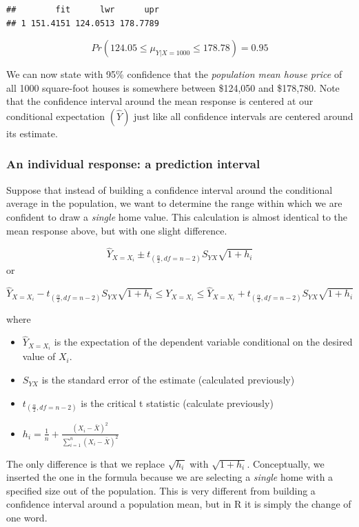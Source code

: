 \documentclass[
]{book}
\begin{document}
\begin{verbatim}
##        fit      lwr      upr
## 1 151.4151 124.0513 178.7789
\end{verbatim}

\[Pr(124.05\leq\mu_{Y|X=1000}\leq178.78)=0.95\]

We can now state with 95\% confidence that the \emph{population mean house price} of all 1000 square-foot houses is somewhere between \$124,050 and \$178,780. Note that the confidence interval around the mean response is centered at our conditional expectation \((\hat{Y})\) just like all confidence intervals are centered around its estimate.

\subsubsection*{An individual response: a prediction interval}\label{an-individual-response-a-prediction-interval}

Suppose that instead of building a confidence interval around the conditional average in the population, we want to determine the range within which we are confident to draw a \emph{single} home value. This calculation is almost identical to the mean response above, but with one slight difference.

\[ \hat{Y}_{X=X_i} \pm t_{(\frac{\alpha}{2},df=n-2)}S_{YX} \sqrt{1+h_i}\]
or

\[ \hat{Y}_{X=X_i} - t_{(\frac{\alpha}{2},df=n-2)}S_{YX} \sqrt{1+h_i} \leq Y_{X=X_i} \leq \hat{Y}_{X=X_i} + t_{(\frac{\alpha}{2},df=n-2)}S_{YX} \sqrt{1+h_i}\]

where

\begin{itemize}
\item
  \(\hat{Y}_{X=X_i}\) is the expectation of the dependent variable conditional on the desired value of \(X_i\).
\item
  \(S_{YX}\) is the standard error of the estimate (calculated previously)
\item
  \(t_{(\frac{\alpha}{2},df=n-2)}\) is the critical t statistic (calculate previously)
\item
  \(h_i = \frac{1}{n}+\frac{(X_i - \bar{X})^2}{\sum_{i=1}^n(X_i - \bar{X})^2}\)
\end{itemize}

The only difference is that we replace \(\sqrt{h_i}\) with \(\sqrt{1+h_i}\). Conceptually, we inserted the one in the formula because we are selecting a \emph{single} home with a specified size out of the population. This is very different from building a confidence interval around a population mean, but in R it is simply the change of one word.
\end{document}
